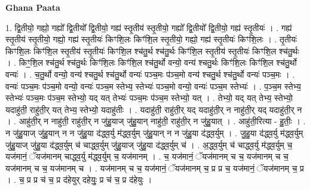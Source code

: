\documentclass[17pt]{extarticle}
\begin{document}
\textbf{Ghana Paata } \newline

1. द्वि॒तीयो॒ गह्यो॒ गह्यो᳚ द्वि॒तीयो᳚ द्वि॒तीयो॒ गह्य॑ स्तृ॒तीय॑ स्तृ॒तीयो॒ गह्यो᳚ द्वि॒तीयो᳚ द्वि॒तीयो॒ गह्य॑ स्तृ॒तीयः॑ । . गह्य॑ स्तृ॒तीय॑ स्तृ॒तीयो॒ गह्यो॒ गह्य॑ स्तृ॒तीयः॑ किꣳशि॒लः किꣳ॑शि॒ल स्तृ॒तीयो॒ गह्यो॒ गह्य॑ स्तृ॒तीयः॑ किꣳशि॒लः । . तृ॒तीयः॑ किꣳशि॒लः किꣳ॑शि॒ल स्तृ॒तीय॑ स्तृ॒तीयः॑ किꣳशि॒ल श्च॑तु॒र्थ श्च॑तु॒र्थः किꣳ॑शि॒ल स्तृ॒तीय॑ स्तृ॒तीयः॑ किꣳशि॒ल श्च॑तु॒र्थः । . किꣳ॒॒शि॒ल श्च॑तु॒र्थ श्च॑तु॒र्थः किꣳ॑शि॒लः किꣳ॑शि॒ल श्च॑तु॒र्थो वन्यो॒ वन्य॑ श्चतु॒र्थः किꣳ॑शि॒लः किꣳ॑शि॒ल श्च॑तु॒र्थो वन्यः॑ । . च॒तु॒र्थो वन्यो॒ वन्य॑ श्चतु॒र्थ श्च॑तु॒र्थो वन्यः॑ पञ्च॒मः प॑ञ्च॒मो वन्य॑ श्चतु॒र्थ श्च॑तु॒र्थो वन्यः॑ पञ्च॒मः । . वन्यः॑ पञ्च॒मः प॑ञ्च॒मो वन्यो॒ वन्यः॑ पञ्च॒म स्तेभ्य॒ स्तेभ्यः॑ पञ्च॒मो वन्यो॒ वन्यः॑ पञ्च॒म स्तेभ्यः॑ । . प॒ञ्च॒म स्तेभ्य॒ स्तेभ्यः॑ पञ्च॒मः प॑ञ्च॒म स्तेभ्यो॒ यद् यत् तेभ्यः॑ पञ्च॒मः प॑ञ्च॒म स्तेभ्यो॒ यत् । . तेभ्यो॒ यद् यत् तेभ्य॒ स्तेभ्यो॒ यदाहु॑ती॒ राहु॑ती॒र् यत् तेभ्य॒ स्तेभ्यो॒ यदाहु॑तीः । . यदाहु॑ती॒ राहु॑ती॒र् यद् यदाहु॑ती॒र् न नाहु॑ती॒र् यद् यदाहु॑ती॒र् न । . आहु॑ती॒र् न नाहु॑ती॒ राहु॑ती॒र् न जु॑हु॒याज् जु॑हु॒यान् नाहु॑ती॒ राहु॑ती॒र् न जु॑हु॒यात् । . आहु॑ती॒रित्या - हु॒तीः॒ । . न जु॑हु॒याज् जु॑हु॒यान् न न जु॑हु॒या द॑द्ध्व॒र्यु म॑द्ध्व॒र्युम् जु॑हु॒यान् न न जु॑हु॒या द॑द्ध्व॒र्युम् । . जु॒हु॒या द॑द्ध्व॒र्यु म॑द्ध्व॒र्युम् जु॑हु॒याज् जु॑हु॒या द॑द्ध्व॒र्युम् च॑ चाद्ध्व॒र्युम् जु॑हु॒याज् जु॑हु॒या द॑द्ध्व॒र्युम् च॑ । . अ॒द्ध्व॒र्युम् च॑ चाद्ध्व॒र्यु म॑द्ध्व॒र्युम् च॒ यज॑मानं॒ ॅयज॑मानम् चाद्ध्व॒र्यु म॑द्ध्व॒र्युम् च॒ यज॑मानम् । . च॒ यज॑मानं॒ ॅयज॑मानम् च च॒ यज॑मानम् च च॒ यज॑मानम् च च॒ यज॑मानम् च । . यज॑मानम् च च॒ यज॑मानं॒ ॅयज॑मानम् च॒ प्र प्र च॒ यज॑मानं॒ ॅयज॑मानम् च॒ प्र । . च॒ प्र प्र च॑ च॒ प्र द॑हेयुर् दहेयुः॒ प्र च॑ च॒ प्र द॑हेयुः । \newline
\end{document}
